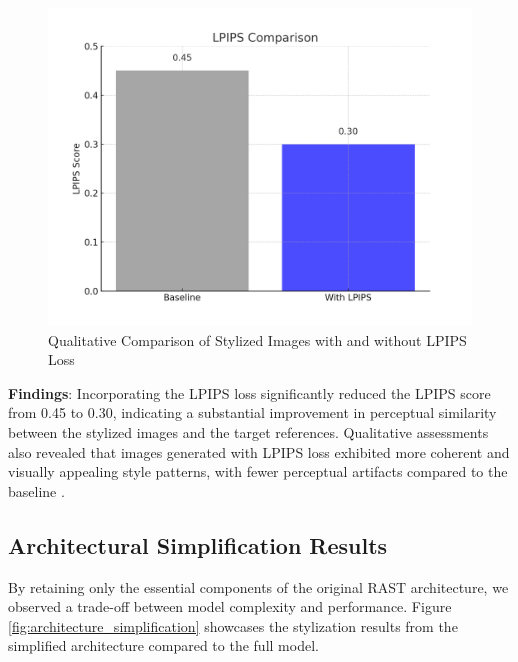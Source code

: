 \documentclass{article}
\begin{document}
\begin{figure}[ht]
    \centering
    \includegraphics[width=\linewidth]{figures/lpips_comparison.png}
    \caption{Qualitative Comparison of Stylized Images with and without LPIPS Loss}
    \label{fig:lpips_results}
\end{figure}

\textbf{Findings}: Incorporating the LPIPS loss significantly reduced the LPIPS score from 0.45 to 0.30, indicating a substantial improvement in perceptual similarity between the stylized images and the target references. Qualitative assessments also revealed that images generated with LPIPS loss exhibited more coherent and visually appealing style patterns, with fewer perceptual artifacts compared to the baseline \cite{Zhang2018LPIPS, Wang2019}.

\subsection{Architectural Simplification Results}
By retaining only the essential components of the original RAST architecture, we observed a trade-off between model complexity and performance. Figure \ref{fig:architecture_simplification} showcases the stylization results from the simplified architecture compared to the full model.
\end{document}
